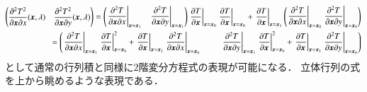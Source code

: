 \documentclass[a4paper,dvipdfmx]{jsarticle}
\newcommand{\pdiff}[3]{
 \ifnum #1<1
 \text{Args[0] should be more than 1} \else{
 \ifnum #1=1 \displaystyle \frac{\partial #2}{\partial #3}\else
 \displaystyle \frac{\partial^{#1} #2}{\partial #3^{#1}}\fi
 }\fi
}
\begin{document}
\begin{align}
    \begin{split}
        \begin{pmatrix}
            \pdiff{1}{{}^2T^2}{\bm{x}\partial x}(\bm{x}, \lambda) &
            \pdiff{1}{{}^2T^2}{\bm{x}\partial y}(\bm{x}, \lambda)
        \end{pmatrix}
        =
        \begin{pmatrix}
            \left.\pdiff{1}{{}^2T}{\bm{x}\partial x}\right|_{\bm{x}=\bm{x}_1} &
            \left.\pdiff{1}{{}^2T}{\bm{x}\partial y}\right|_{\bm{x}=\bm{x}_1}
        \end{pmatrix}
        \left.\pdiff{1}{T}{\bm{x}}\right|_{\bm{x}=\bm{x}_0}
        \left.\pdiff{1}{T}{\bm{x}}\right|_{\bm{x}=\bm{x}_0}
        + \left.\pdiff{1}{T}{\bm{x}}\right|_{\bm{x}=\bm{x}_1}
        \begin{pmatrix}
            \left.\pdiff{1}{{}^2T}{\bm{x}\partial x}\right|_{\bm{x}=\bm{x}_0}
            \left.\pdiff{1}{{}^2T}{\bm{x}\partial y}\right|_{\bm{x}=\bm{x}_0}
        \end{pmatrix}\\
        =
        \begin{pmatrix}
            \left.\pdiff{1}{{}^2T}{\bm{x}\partial x}\right|_{\bm{x}=\bm{x}_1}
            \left.\pdiff{1}{T}{\bm{x}}\right|_{\bm{x}=\bm{x}_0}^2
            + \left.\pdiff{1}{T}{\bm{x}}\right|_{\bm{x}=\bm{x}_1}
            \left.\pdiff{1}{{}^2T}{\bm{x}\partial x}\right|_{\bm{x}=\bm{x}_0} &
            {}\hspace{0.5cm}
            \left.\pdiff{1}{{}^2T}{\bm{x}\partial y}\right|_{\bm{x}=\bm{x}_1}
            \left.\pdiff{1}{T}{\bm{x}}\right|_{\bm{x}=\bm{x}_0}^2
            + \left.\pdiff{1}{T}{\bm{x}}\right|_{\bm{x}=\bm{x}_1}
            \left.\pdiff{1}{{}^2T}{\bm{x}\partial y}\right|_{\bm{x}=\bm{x}_0}
        \end{pmatrix}    
    \end{split}
\end{align}
として通常の行列積と同様に$2$階変分方程式の表現が可能になる．
立体行列の式を上から眺めるような表現である\cite{3d}．
\end{document}
